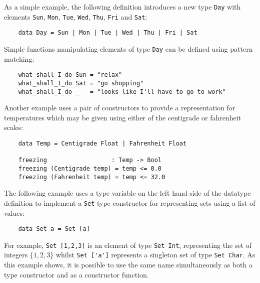 As a simple example, the following definition introduces a new type \verb"Day"
with elements \verb"Sun", \verb"Mon", \verb"Tue", \verb"Wed", \verb"Thu", \verb"Fri" and \verb"Sat":
\begin{verbatim}
    data Day = Sun | Mon | Tue | Wed | Thu | Fri | Sat
\end{verbatim}
Simple functions manipulating elements of type \verb"Day" can be defined using
pattern matching:
\begin{verbatim}
    what_shall_I_do Sun = "relax"
    what_shall_I_do Sat = "go shopping"
    what_shall_I_do _   = "looks like I'll have to go to work"
\end{verbatim}
Another example uses a pair of constructors to provide a representation
for temperatures which may be given using either of the  centigrade  or
fahrenheit scales:
\begin{verbatim}
    data Temp = Centigrade Float | Fahrenheit Float

    freezing                  : Temp -> Bool
    freezing (Centigrade temp) = temp <= 0.0
    freezing (Fahrenheit temp) = temp <= 32.0
\end{verbatim}
The following example uses a type variable on the left hand side of the
datatype  definition  to  implement  a   \verb"Set" type   constructor   for
representing sets using a list of values:
\begin{verbatim}
    data Set a = Set [a]
\end{verbatim}
For example, \verb"Set [1,2,3]" is an element of type  \verb"Set Int",  
representing
the set of integers $\{1, 2, 3\}$ whilst 
\verb"Set ['a']" represents  a  singleton
set of type \verb"Set Char".  As this example shows, it is possible to use the
same  name  simultaneously  as  both  a  type  constructor  and  as   a
constructor function.

